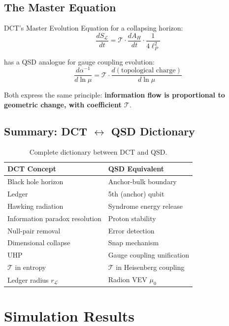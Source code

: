 \documentclass[11pt,a4paper]{article}
\theoremstyle{definition}
\newcommand{\Tc}{\mathcal{T}}           %
\newcommand{\murad}{\mu_0}              %
\newcommand{\LL}{\mathcal{L}}           %
\begin{document}
\subsection{The Master Equation}

DCT's Master Evolution Equation for a collapsing horizon:
\begin{equation}
\frac{dS_{\LL}}{dt} = \Tc \cdot \frac{dA_H}{dt} \cdot \frac{1}{4\ell_P^2}
\end{equation}

has a QSD analogue for gauge coupling evolution:
\begin{equation}
\frac{d\alpha^{-1}}{d\ln\mu} = \Tc \cdot \frac{d(\text{topological charge})}{d\ln\mu}
\end{equation}

Both express the same principle: \textbf{information flow is proportional to geometric change, with coefficient $\Tc$}.

\subsection{Summary: DCT $\leftrightarrow$ QSD Dictionary}

\begin{table}[h]
\centering
\begin{tabular}{ll}
\toprule
\textbf{DCT Concept} & \textbf{QSD Equivalent} \\
\midrule
Black hole horizon & Anchor-bulk boundary \\
Ledger & 5th (anchor) qubit \\
Hawking radiation & Syndrome energy release \\
Information paradox resolution & Proton stability \\
Null-pair removal & Error detection \\
Dimensional collapse & Snap mechanism \\
UHP & Gauge coupling unification \\
$\Tc$ in entropy & $\Tc$ in Heisenberg coupling \\
Ledger radius $r_{\LL}$ & Radion VEV $\murad$ \\
\bottomrule
\end{tabular}
\caption{Complete dictionary between DCT and QSD.}
\end{table}

\section{Simulation Results}
\label{app:simulations}
\end{document}
